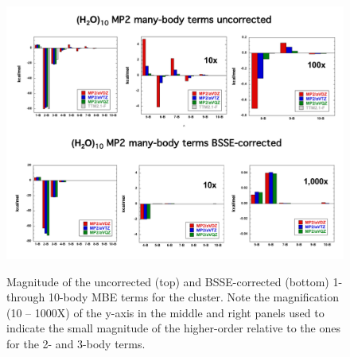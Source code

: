 \documentclass[11pt, proquest]{uwthesis}[2020/02/24]
\let\ce\ch
\begin{document}
\begin{figure}[t]
\uwsinglespace
\centering
\includegraphics[width=\textwidth]{Figures/Chapter_2/W10_MP2_MB.pdf}
\label{fig:MBE_I_F2}
\caption[Magnitude of the uncorrected (top) and BSSE-corrected (bottom) 1- through 10-body MBE terms for the \ce{(H2O)_{10}} cluster. Note the magnification (10 – 1000X) of the y-axis in the middle and right panels used to indicate the small magnitude of the higher-order relative to the ones for the 2- and 3-body terms.]{Magnitude of the uncorrected (top) and BSSE-corrected (bottom) 1- through 10-body MBE terms for the \ce{(H2O)_{10}} cluster. Note the magnification (10 – 1000X) of the y-axis in the middle and right panels used to indicate the small magnitude of the higher-order relative to the ones for the 2- and 3-body terms.}
\end{figure}
\end{document}
